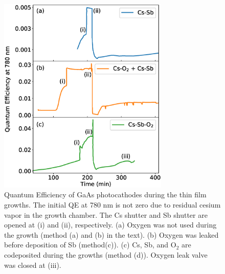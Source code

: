\begin{figure}
	\centering
	\includegraphics*[width=230pt]{figs/CsSbO/growths_all.eps}
	\caption{Quantum Efficiency of GaAs photocathodes during the thin film growths. The initial QE at 780 nm is not zero due to residual cesium vapor in the growth chamber. The Cs shutter and Sb shutter are opened at (i) and (ii), respectively. (a) Oxygen was not used during the growth (method (a) and (b) in the text). (b) Oxygen was leaked before deposition of Sb (method(c)). (c) Cs, Sb, and O$_2$ are codeposited during the growths (method (d)). Oxygen leak valve was closed at (iii).}
	\label{fig_growth}
\end{figure}


